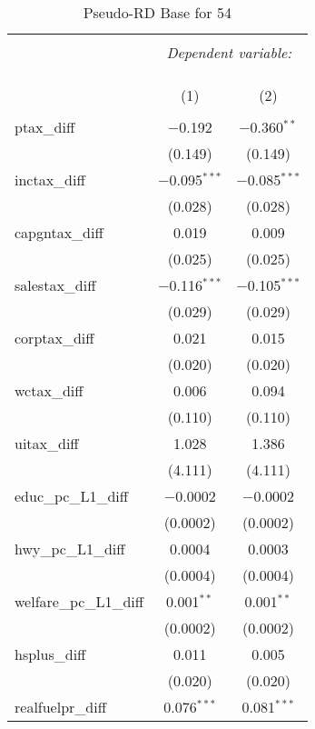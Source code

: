 
\begin{table}[!htbp] \centering 
  \caption{Pseudo-RD Base for  54} 
  \label{} 
\begin{tabular}{@{\extracolsep{5pt}}lcc} 
\\[-1.8ex]\hline 
\hline \\[-1.8ex] 
 & \multicolumn{2}{c}{\textit{Dependent variable:}} \\ 
\cline{2-3} 
\\[-1.8ex] & \multicolumn{2}{c}{ } \\ 
\\[-1.8ex] & (1) & (2)\\ 
\hline \\[-1.8ex] 
 ptax\_diff & $-$0.192 & $-$0.360$^{**}$ \\ 
  & (0.149) & (0.149) \\ 
  inctax\_diff & $-$0.095$^{***}$ & $-$0.085$^{***}$ \\ 
  & (0.028) & (0.028) \\ 
  capgntax\_diff & 0.019 & 0.009 \\ 
  & (0.025) & (0.025) \\ 
  salestax\_diff & $-$0.116$^{***}$ & $-$0.105$^{***}$ \\ 
  & (0.029) & (0.029) \\ 
  corptax\_diff & 0.021 & 0.015 \\ 
  & (0.020) & (0.020) \\ 
  wctax\_diff & 0.006 & 0.094 \\ 
  & (0.110) & (0.110) \\ 
  uitax\_diff & 1.028 & 1.386 \\ 
  & (4.111) & (4.111) \\ 
  educ\_pc\_L1\_diff & $-$0.0002 & $-$0.0002 \\ 
  & (0.0002) & (0.0002) \\ 
  hwy\_pc\_L1\_diff & 0.0004 & 0.0003 \\ 
  & (0.0004) & (0.0004) \\ 
  welfare\_pc\_L1\_diff & 0.001$^{**}$ & 0.001$^{**}$ \\ 
  & (0.0002) & (0.0002) \\ 
  hsplus\_diff & 0.011 & 0.005 \\ 
  & (0.020) & (0.020) \\ 
  realfuelpr\_diff & 0.076$^{***}$ & 0.081$^{***}$ \\ 

\end{tabular}
\end{table}

